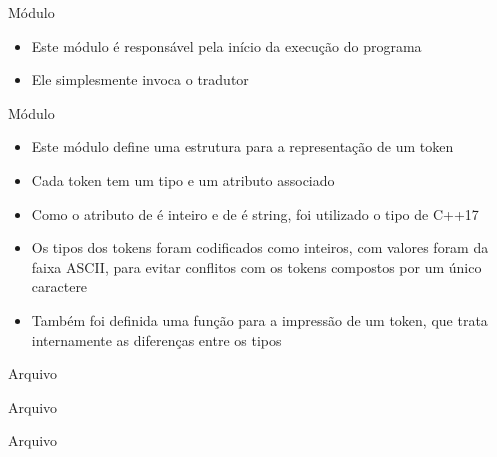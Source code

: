 \begin{frame}[fragile]{Módulo }

    \begin{itemize}
        \item Este módulo é responsável pela início da execução do programa

        \item Ele simplesmente invoca o tradutor
    \end{itemize}


\end{frame}

\begin{frame}[fragile]{Módulo }

    \begin{itemize}
        \item Este módulo define uma estrutura para a representação de um token

        \item Cada token tem um tipo e um atributo associado

        \item Como o atributo de  é inteiro e de  é string, foi utilizado o tipo  de C++17

        \item Os tipos dos tokens foram codificados como inteiros, com valores foram da faixa ASCII, para evitar conflitos com os tokens compostos por um
            único caractere

        \item Também foi definida uma função para a impressão de um token, que trata internamente as diferenças entre os tipos
    \end{itemize}

\end{frame}

\begin{frame}[fragile]{Arquivo }
\end{frame}

\begin{frame}[fragile]{Arquivo }
\end{frame}

\begin{frame}[fragile]{Arquivo }
\end{frame}

